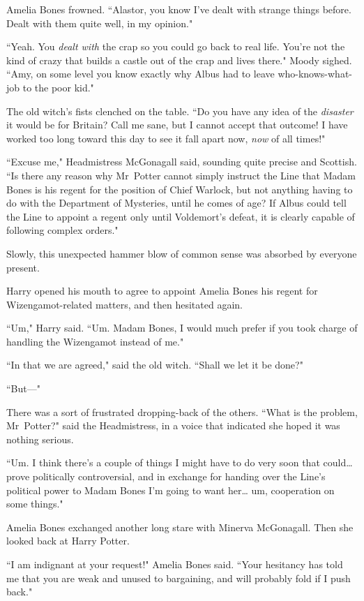 Amelia Bones frowned. ``Alastor, you know I've dealt with strange things before. Dealt with them quite well, in my opinion."

``Yeah. You \emph{dealt with} the crap so you could go back to real life. You're not the kind of crazy that builds a castle out of the crap and lives there." Moody sighed. ``Amy, on some level you know exactly why Albus had to leave who-knows-what-job to the poor kid."

The old witch's fists clenched on the table. ``Do you have any idea of the \emph{disaster} it would be for Britain? Call me sane, but I cannot accept that outcome! I have worked too long toward this day to see it fall apart now, \emph{now} of all times!"

``Excuse me," Headmistress McGonagall said, sounding quite precise and Scottish. ``Is there any reason why Mr~Potter cannot simply instruct the Line that Madam Bones is his regent for the position of Chief Warlock, but not anything having to do with the Department of Mysteries, until he comes of age? If Albus could tell the Line to appoint a regent only until Voldemort's defeat, it is clearly capable of following complex orders."

Slowly, this unexpected hammer blow of common sense was absorbed by everyone present.

Harry opened his mouth to agree to appoint Amelia Bones his regent for Wizengamot-related matters, and then hesitated again.

``Um," Harry said. ``Um. Madam Bones, I would much prefer if you took charge of handling the Wizengamot instead of me."

``In that we are agreed," said the old witch. ``Shall we let it be done?"

``But—"

There was a sort of frustrated dropping-back of the others. ``What is the problem, Mr~Potter?" said the Headmistress, in a voice that indicated she hoped it was nothing serious.

``Um. I think there's a couple of things I might have to do very soon that could{\ldots} prove politically controversial, and in exchange for handing over the Line's political power to Madam Bones I'm going to want her{\ldots} um, cooperation on some things."

Amelia Bones exchanged another long stare with Minerva McGonagall. Then she looked back at Harry Potter.

``I am indignant at your request!" Amelia Bones said. ``Your hesitancy has told me that you are weak and unused to bargaining, and will probably fold if I push back."

